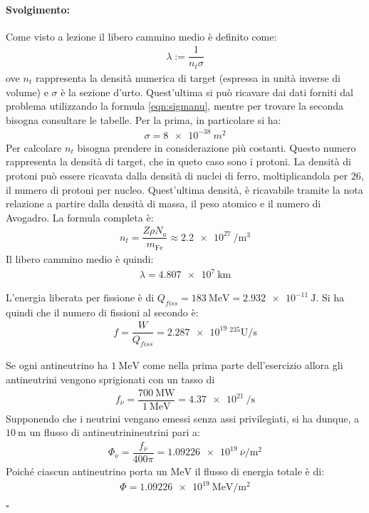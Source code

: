 \documentclass[10pt, a4paper]{article}
\newcommand*\chem[1]{\ensuremath{\mathrm{#1}}}
\theoremstyle{plain}
\newenvironment{svol}{\paragraph{Svolgimento:}}{\hfill$\square$\newline}
\begin{document}
	\begin{svol}
		Come visto a lezione il libero cammino medio è definito come:
		\begin{gather}
		\label{eqn:libcammdef}
		\lambda:=\dfrac{1}{n_{t}\sigma}
		\end{gather}
		ove $ n_{t} $ rappresenta la densità numerica di target (espressa in unità inverse di volume) e $ \sigma $ è la sezione d'urto. Quest'ultima si può ricavare dai dati forniti dal problema utilizzando la formula \ref{eqn:sigmanu}, mentre per trovare la seconda bisogna consultare le tabelle. Per la prima, in particolare si ha:
		\begin{gather}
			\sigma=\SI{8e-38}{m^{2}}
		\end{gather} 
		Per calcolare $ n_{t} $ bisogna prendere in considerazione più costanti. Questo numero rappresenta la densità di target, che in queto caso sono i protoni. La densità di protoni può essere ricavata dalla densità di nuclei di ferro, moltiplicandola per 26, il numero di protoni per nucleo. Quest'ultima densità, è ricavabile tramite la nota relazione a partire dalla densità di massa, il peso atomico e il numero di Avogadro. La formula completa è:
		\begin{gather}
			n_{t}=\dfrac{Z\rho N_{a}}{m_{\chem{Fe}}}\approx\SI{2.2e27}{\per\meter\cubed}
		\end{gather}
		Il libero cammino medio è quindi:
		\begin{gather}
		\lambda=\SI{4.807e7}{\kilo\meter}
		\end{gather}
		
		
		L'energia liberata per fissione è di $ Q_{fiss}=\SI{183}{\mega\electronvolt}=\SI{2.932e-11}{\joule} $. Si ha quindi che il numero di fissioni al secondo è:
		\begin{gather*}
			f=\dfrac{W}{Q_{fiss}}=\SI{2.287e19}{\chem{^{235}U}\per\second}
		\end{gather*}
		
		
		Se ogni antineutrino ha $ \SI{1}{\mega\electronvolt} $ come nella prima parte dell'esercizio allora gli antineutrini vengono sprigionati con un tasso di 
		\begin{gather*}
			f_{\overline{\nu}}=\dfrac{\SI{700}{\mega\watt}}{\SI{1}{\mega\electronvolt}}=\SI{4.37e21}{\per\second}
		\end{gather*}
		Supponendo che i neutrini vengano emessi senza assi privilegiati, si ha dunque, a $ \SI{10}{\meter} $ un flusso di antineutrinineutrini pari a:
		\begin{gather*}
			\Phi_{\overline{\nu}}=\dfrac{f_{\overline{\nu}}}{400\pi}=\SI{1.09226e19}{\overline{\nu}\per\meter\squared}
		\end{gather*}
		Poiché ciascun antineutrino porta un $ \si{\mega\electronvolt} $ il flusso di energia totale è di:
		\begin{gather*}
			\Phi=\SI{1.09226e19}{\mega\electronvolt\per\meter\squared}
		\end{gather*}
		

\end{svol}
\end{document}
